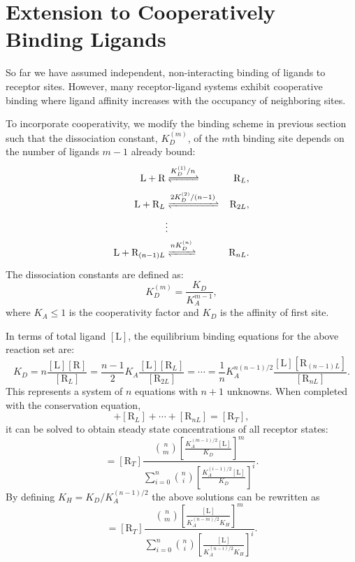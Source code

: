 \section{Extension to Cooperatively Binding Ligands}

So far we have assumed independent, non-interacting binding of ligands to receptor sites. However, many receptor-ligand systems exhibit cooperative binding where ligand affinity increases with the occupancy of neighboring sites.

To incorporate cooperativity, we modify the binding scheme in previous section such that the dissociation constant, $K_D^{(m)}$, of the $m$th binding site depends on the number of ligands $m-1$ already bound:
\begin{align*}
    \text{L} + \text{R} & \xrightleftharpoons{K_D^{(1)}/n}& \text{R}_L, \\
    \text{L} + \text{R}_L & \xrightleftharpoons{2K_D^{(2)}/(n-1)}& \text{R}_{2L}, \\
    & \vdots &  \nonumber \\
    \text{L} + \text{R}_{(n-1)L} & \xrightleftharpoons{nK_D^{(n)}} & \text{R}_{nL}. 
\end{align*}
The dissociation constants are defined as:
\begin{equation*}
K_D^{(m)} = \frac{K_D}{K_A^{m-1}},
\end{equation*}
where $K_A \leq 1$ is the cooperativity factor and $K_D$ is the affinity of first site.

In terms of total ligand $[\text{L}]$, the equilibrium binding equations for the above reaction set are:
\begin{equation*}
K_D = n \frac{[\text{L}][\text{R}]}{[\text{R}_L]} = \frac{n-1}{2} K_A \frac{[\text{L}][\text{R}_L]}{[\text{R}_{2L}]} = \cdots = \frac{1}{n} K_A^{n(n-1)/2} \frac{[\text{L}][\text{R}_{(n-1)L}]}{[\text{R}_{nL}]}.
\end{equation*}
This represents a system of $n$ equations with $n+1$ unknowns. When completed with the conservation equation,
\begin{equation*}
    [\text{R}] + [\text{R}_L] + \cdots + [\text{R}_{nL}] = [\text{R}_T],
\end{equation*}
it can be solved to obtain steady state concentrations of all receptor states:
\begin{equation*}
    [\text{R}_{mL}] = [\text{R}_T] \frac{\binom{n}{m}\left[\frac{K_A^{(m-1)/2}[\text{L}]}{K_D}\right]^m}{\sum_{i=0}^n \binom{n}{i}\left[\frac{K_A^{(i-1)/2}[\text{L}]}{K_D}\right]^i}.
\end{equation*}
By defining $K_H = K_D/K_A^{(n-1)/2}$ the above solutions can be rewritten as
\begin{equation}
    [\text{R}_{mL}] = [\text{R}_T] \frac{\binom{n}{m}\left[\frac{[\text{L}]}{K_A^{(n-m)/2}K_H}\right]^m}{\sum_{i=0}^n \binom{n}{i}\left[\frac{[\text{L}]}{K_A^{(n-i)/2}K_H}\right]^i}.
\label{eq:24.10}
\end{equation}

